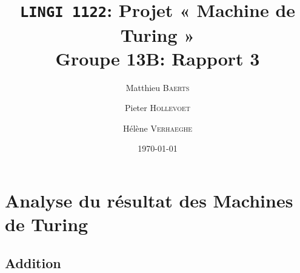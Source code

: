 \documentclass[a4paper,11pt]{article}
\title{\texttt{LINGI 1122}: Projet « Machine de Turing » \\ {\large Groupe 13B: Rapport 3}}
\author{Matthieu \textsc{Baerts} \and Pieter \textsc{Hollevoet} \and Hélène \textsc{Verhaeghe}}
\date{\today}
\begin{document}
\maketitle
\section{Analyse du résultat des Machines de Turing}

    \subsection{Addition}
\end{document}
